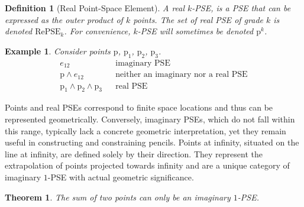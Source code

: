 \documentclass{birkjour}
\newtheorem{theorem}{Theorem}
\newtheorem{definition}{Definition}
\newtheorem{example}{Example}
\begin{document}
\begin{definition}[Real Point-Space Element]
A real \(k\)-PSE, is a PSE that can be expressed as the outer product of \(k\) points.
The set of real PSE of grade \(k\) is denoted \(\mathrm{RePSE}_k\).
For convenience, \(k\)-PSE will sometimes be denoted \(\mathrm{p}^k\).
\end{definition}
\begin{example}
Consider points \(\mathrm{p}\), \(\mathrm{p}_1\), \(\mathrm{p}_2\), \(\mathrm{p}_3\).
\begin{align}
e_{12} && \mbox{imaginary PSE} \\
\mathrm{p} \wedge e_{12} && \mbox{neither an imaginary nor a real PSE} \\
\mathrm{p}_1\wedge\mathrm{p}_2\wedge\mathrm{p}_3 && \mbox{real PSE}    
\end{align}
\end{example}

Points and real PSEs correspond to finite space locations and thus can be represented geometrically. Conversely, imaginary PSEs, which do not fall within this range, typically lack a concrete geometric interpretation, yet they remain useful in constructing and constraining pencils. Points at infinity, situated on the line at infinity, are defined solely by their direction. They represent the extrapolation of points projected towards infinity and are a unique category of imaginary \(1\)-PSE with actual geometric significance.

\begin{theorem}\label{th:sum-of-2-point-is-imaginary}
    The sum of two points can only be an imaginary \(1\)-PSE.
\end{theorem}
\end{document}
